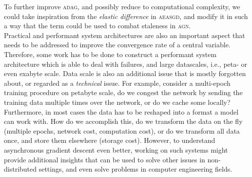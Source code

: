 To further improve \textsc{adag}, and possibly reduce to computational complexity, we could take inspiration from the \emph{elastic difference} in \textsc{aeasgd}, and modify it in such a way that the term could be used to combat staleness in \textsc{agn}.\\

Practical and performant system architectures are also an important aspect that needs to be addressed to improve the convergence rate of a central variable. Therefore, some work has to be done to construct a performant system architecture which is able to deal with failures, and large datascales, i.e., peta- or even exabyte scale. Data scale is also an additional issue that is mostly forgotten about, or regarded as a \emph{technical} issue. For example, consider a multi-epoch training procedure on petabyte scale, do we congest the network by sending the training data multiple times over the network, or do we cache some locally? Furthermore, in most cases the data has to be reshaped into a format a model can work with. How do we accomplish this, do we transform the data on the fly (multiple epochs, network cost, computation cost), or do we transform all data once, and store them elsewhere (storage cost). However, to understand asynchronous gradient descent even better, working on such systems might provide additional insights that can be used to solve other issues in non-distributed settings, and even solve problems in computer engineering fields.
